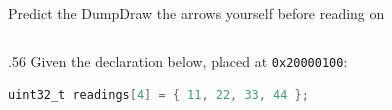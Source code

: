 \documentclass[9pt,aspectratio=169,xcolor=table]{beamer}
\begin{document}
{\beamerextras
\begin{frame}[fragile]{Predict the Dump}{Draw the arrows yourself before reading on}
    \begin{columns}[c]
    \begin{column}{.56\textwidth}
    \leavevmode
Given the declaration below, placed at \texttt{0x20000100}:

\vspace{2mm}
\begin{center}
	\begin{minipage}{\textwidth}
		\begin{lstlisting}[language=C, basicstyle=\ttfamily\footnotesize]
uint32_t readings[4] = { 11, 22, 33, 44 };
\end{lstlisting}
	\end{minipage}
\end{center}


\end{column}
\end{columns}
\end{frame}}
\end{document}
